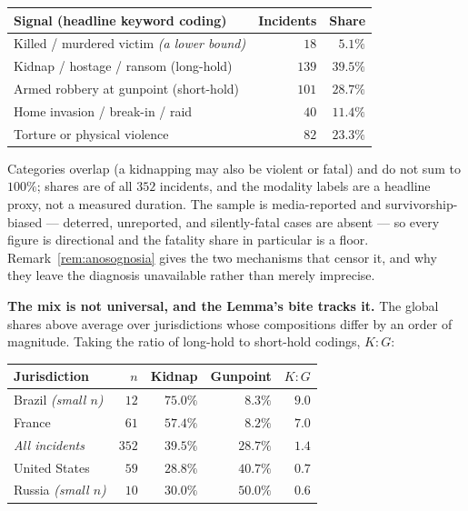 \begin{center}\small
\begin{tabular}{@{}lrr@{}}
\toprule
\textbf{Signal (headline keyword coding)} & \textbf{Incidents} & \textbf{Share} \\
\midrule
Killed / murdered victim \emph{(a lower bound)} & $18$  & $5.1\%$  \\
Kidnap / hostage / ransom (long-hold)           & $139$ & $39.5\%$ \\
Armed robbery at gunpoint (short-hold)          & $101$ & $28.7\%$ \\
Home invasion / break-in / raid                 & $40$  & $11.4\%$ \\
Torture or physical violence                    & $82$  & $23.3\%$ \\
\bottomrule
\end{tabular}
\end{center}

\noindent Categories overlap (a kidnapping may also be violent or fatal) and do not
sum to $100\%$; shares are of all $352$ incidents, and the modality labels are a
headline proxy, not a measured duration. The sample is media-reported and
survivorship-biased --- deterred, unreported, and silently-fatal cases are absent ---
so every figure is directional and the fatality share in particular is a floor.
Remark~\ref{rem:anosognosia} gives the two mechanisms that censor it, and why they
leave the diagnosis unavailable rather than merely imprecise.

\medskip\noindent\textbf{The mix is not universal, and the Lemma's bite tracks it.} The
global shares above average over jurisdictions whose compositions differ by an order of magnitude.
Taking the ratio of long-hold to short-hold codings, $K{:}G$:

\begin{center}\small
\begin{tabular}{@{}lrrrr@{}}
\toprule
\textbf{Jurisdiction} & \textbf{$n$} & \textbf{Kidnap} & \textbf{Gunpoint} & \textbf{$K{:}G$} \\
\midrule
Brazil \emph{(small $n$)}  & $12$  & $75.0\%$ & $8.3\%$  & $9.0$ \\
France                     & $61$  & $57.4\%$ & $8.2\%$  & $7.0$ \\
\emph{All incidents}       & $352$ & $39.5\%$ & $28.7\%$ & $1.4$ \\
United States              & $59$  & $28.8\%$ & $40.7\%$ & $0.7$ \\
Russia \emph{(small $n$)}  & $10$  & $30.0\%$ & $50.0\%$ & $0.6$ \\
\bottomrule
\end{tabular}
\end{center}

